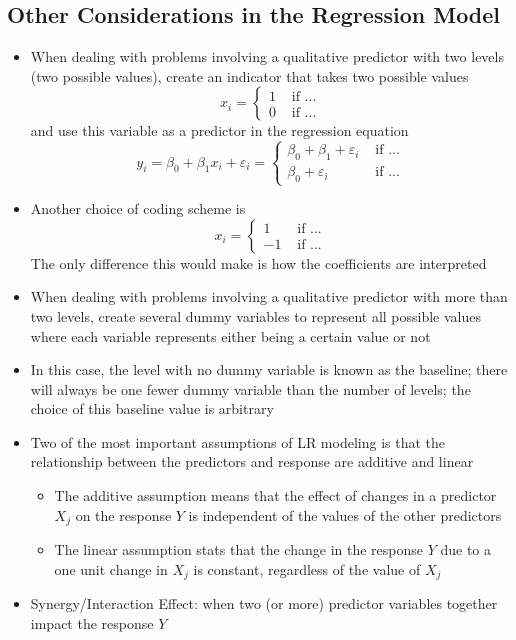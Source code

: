 \documentclass[12pt]{article}
\begin{document}
\subsection{Other Considerations in the Regression Model}
\begin{itemize} 
\item When dealing with problems involving a qualitative predictor with two levels (two possible values), create an indicator that takes two possible values 
$$ x_i = \begin{cases} 1 &\text{ if ...} \\ 0 &\text{ if ...} \end{cases} $$ 
and use this variable as a predictor in the regression equation $$ y_i = \beta_0 + \beta_1x_i + \varepsilon_i = \begin{cases} \beta_0 + \beta_1 + \varepsilon_i &\text{ if ...} \\\beta_0 + \varepsilon_i &\text{ if ...} \end{cases} $$ 
\item Another choice of coding scheme is $$ x_i = \begin{cases} 1 &\text{ if ...} \\ -1 &\text{ if ...} \end{cases} $$ The only difference this would make is how the coefficients are interpreted 
\item When dealing with problems involving a qualitative predictor with more than two levels, create several dummy variables to represent all possible values where each variable represents either being a certain value or not 
\item In this case, the level with no dummy variable is known as the baseline; there will always be one fewer dummy variable than the number of levels; the choice of this baseline value is arbitrary 
\item Two of the most important assumptions of LR modeling is that the relationship between the predictors and response are additive and linear \begin{itemize} 
\item The additive assumption means that the effect of changes in a predictor $X_j$ on the response $Y$ is independent of the values of the other predictors 
\item The linear assumption stats that the change in the response $Y$ due to a one unit change in $X_j$ is constant, regardless of the value of $X_j$ \end{itemize} 
\item Synergy/Interaction Effect: when two (or more) predictor variables together impact the response $Y$

\end{itemize}
\end{document}
